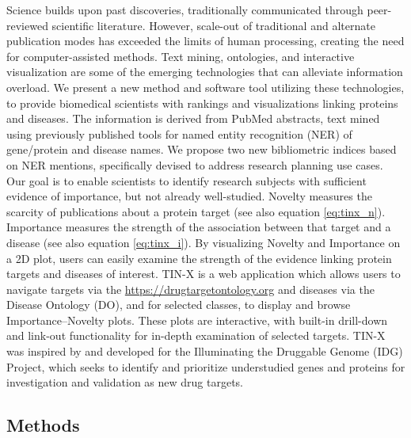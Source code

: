 Science builds upon past discoveries, traditionally communicated through peer-reviewed scientific literature. However, scale-out of traditional and alternate publication modes has exceeded the limits of human processing, creating the need for computer-assisted methods\cite{Hunter2006-om}. Text mining, ontologies, and interactive visualization are some of the emerging technologies that can alleviate information overload. We present a new method and software tool utilizing these technologies, to provide biomedical scientists with rankings and visualizations linking proteins and diseases. The information is derived from PubMed abstracts, text mined using previously published tools for named entity recognition (NER) of gene/protein and disease names\cite{Pletscher-Frankild2015-oo,Szklarczyk2015-bl}. We propose two new bibliometric indices based on NER mentions, specifically devised to address research planning use cases. Our goal is to enable scientists to identify research subjects with sufficient evidence of importance, but not already well-studied. Novelty measures the scarcity of publications about a protein target (see also equation \ref{eq:tinx_n}). Importance measures the strength of the association between that target and a disease (see also equation \ref{eq:tinx_i}). By visualizing Novelty and Importance on a 2D plot, users can easily examine the strength of the evidence linking protein targets and diseases of interest. TIN-X is a web application which allows users to navigate targets via the \href{Drug Target Ontology (DTO)}{https://drugtargetontology.org} and diseases via the Disease Ontology (DO)\cite{Kibbe2015-li}, and for selected classes, to display and browse Importance–Novelty plots. These plots are interactive, with built-in drill-down and link-out functionality for in-depth examination of selected targets. TIN-X was inspired by and developed for the Illuminating the Druggable Genome (IDG) Project\cite{Oprea2018-cp}, which seeks to identify and prioritize understudied genes and proteins for investigation and validation as new drug targets.

\subsection{Methods}

